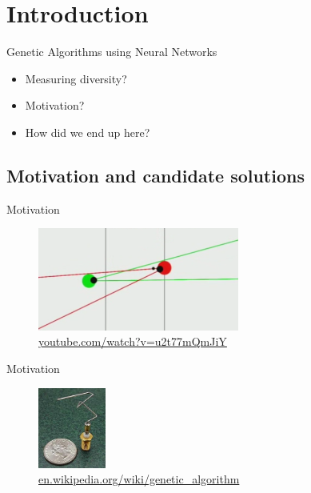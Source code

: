 
\section{Introduction}

\begin{frame}{Genetic Algorithms using Neural Networks}

  \begin{itemize}
    \item Measuring diversity?
    \item Motivation?
    \item How did we end up here?
  \end{itemize}
\end{frame}

\subsection{Motivation and candidate solutions}

\begin{frame}{Motivation}
  \begin{figure}
    \centering
    \includegraphics[width=250px]{elias/images/sniper.png}
    \caption{\url{youtube.com/watch?v=u2t77mQmJiY}}
  \end{figure}
\end{frame}


\begin{frame}{Motivation}
  \begin{figure}
    \centering
    \includegraphics[height=100px]{elias/images/antenna.jpg}
    \caption{\url{en.wikipedia.org/wiki/genetic_algorithm}}
  \end{figure}
\end{frame}


